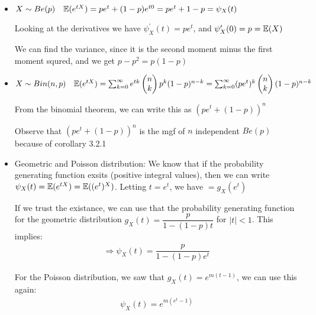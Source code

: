 \begin{itemize}
  \item $X\sim Be(p)\quad\mathbb{E}(e^{tX}) = pe^t+(1-p)e^{t0} = pe^t+1-p = \psi_X(t)$\par
    \noindent Looking at the derivatives we have $\psi_X^{\prime}(t) = pe^t$, and $\psi_X^{\prime}(0) = p = \mathbb{E}(X)$\par
    \noindent We can find the variance, since it is the second moment minus the first moment squred, and we get $p-p^2 = p(1-p)$ 
    \par\bigskip
  \item $X\sim Bin(n,p)\quad\mathbb{E}(e^{tX}) = \sum_{k=0}^{\infty}e^{tk}\begin{pmatrix}n\\k\end{pmatrix}p^k(1-p)^{n-k} = \sum_{k=0}^{\infty}(pe^t)^k\begin{pmatrix}n\\k\end{pmatrix}(1-p)^{n-k}$\par
    \noindent From the binomial theorem, we can write this as $(pe^t+(1-p))^n$\par
    \noindent Observe that $(pe^t+(1-p))^n$ is the mgf of $n$ independent $Be(p)$ because of corollary 3.2.1
    \par\bigskip
  \item Geometric and Poisson distribution: We know that if the probability generating function exsits (positive integral values), then we can write $\psi_X(t) = \mathbb{E}(e^{tX}) = \mathbb{E}((e^t)^X)$. Letting $t = e^t$, we have $=g_X(e^t)$\par
    \noindent If we trust the existance, we can use that the probability generating function for the geometric distribution $g_X(t) = \dfrac{p}{1-(1-p)t}$ for $\left|t\right|<1$. This implies:
    \begin{equation*}
      \begin{gathered}
        \Rightarrow \psi_X(t) = \dfrac{p}{1-(1-p)e^t}
      \end{gathered}
    \end{equation*}
    \par\bigskip
    \noindent For the Poisson distribution, we saw that $g_X(t) = e^{m(t-1)}$, we can use this again:
    \begin{equation*}
      \begin{gathered}
        \psi_X(t) = e^{m(e^t-1)}
      \end{gathered}
    \end{equation*}
\end{itemize}
